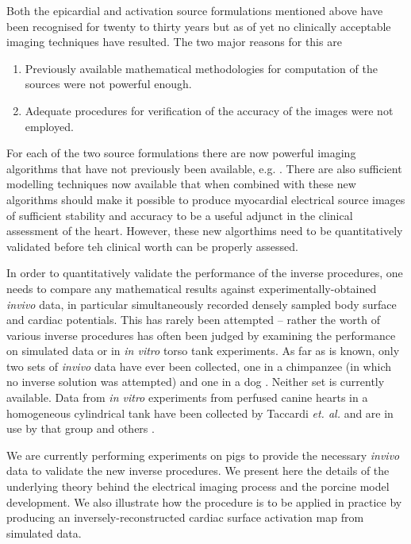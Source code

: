 Both the epicardial and activation source formulations mentioned above have
been recognised for twenty to thirty years but as of yet no clinically
acceptable imaging techniques have resulted. The two major reasons for this
are
\begin{enumerate}
\item Previously available mathematical methodologies for computation of the
  sources were not powerful enough.
\item Adequate procedures for verification of the accuracy of the images were
  not employed.
\end{enumerate}
For each of the two source formulations there are now powerful imaging
algorithms that have not previously been available, 
e.g. \cite{greensite:1998b,greensite:1998,huiskamp:1997}. There are also
sufficient modelling techniques now available that when combined with these new
algorithms should make it possible to produce myocardial electrical source images of
sufficient stability and accuracy to be a useful adjunct in the clinical
assessment of the heart. However, these new algorthims need to be quantitatively
validated before teh clinical worth can be properly assessed.

In order to quantitatively validate the performance of the inverse procedures, one
needs to compare any mathematical results against experimentally-obtained 
\emph{invivo} data, in particular simultaneously recorded densely sampled body
surface and cardiac potentials.  This has rarely been attempted -- rather the
worth of various inverse procedures has often been judged by examining the
performance on simulated data or in \emph{in vitro} torso tank experiments.  As
far as is known, only two sets of \emph{invivo} data have ever been collected, one
in a chimpanzee \cite{spach:1979} (in which no inverse solution was attempted)
and one in a dog \cite{barr:1978}.  Neither set is currently available.  Data
from \emph{in vitro} experiments from perfused canine hearts in a homogeneous
cylindrical tank have been collected by Taccardi \emph{et. al.} and are in use by that
group and others \cite{oster:1992,oster:1997,oster:1998}.

We are currently performing experiments on pigs to provide the necessary \emph{invivo}
data to validate the new inverse procedures.  We present here the details of
the underlying theory behind the electrical imaging process and the porcine
model development.  We also illustrate how the procedure is to be applied in
practice by producing an inversely-reconstructed cardiac surface activation
map from simulated data.  


